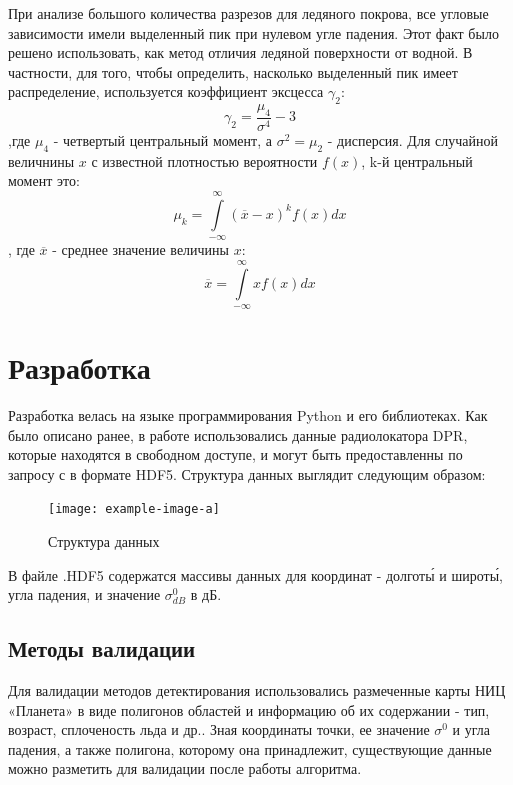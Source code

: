 При анализе большого количества разрезов для ледяного покрова, все  угловые зависимости имели выделенный пик при нулевом
угле падения. Этот факт было решено использовать, как метод отличия ледяной поверхности от водной. В частности, для
того, чтобы определить, насколько выделенный пик имеет распределение, используется коэффициент эксцесса $\gamma_2$:
\begin{equation}
  \gamma_2 = \frac{\mu_4}{\sigma^4} -3
  \label{eq:5}
\end{equation}
,где $\mu_4$ - четвертый центральный момент, а $\sigma^2 = \mu_2$ - дисперсия. Для случайной величнины $x$ с известной плотностью вероятности $f(x)$, k-й
центральный момент это:
\begin{equation}
  \mu_k = \int \limits_{-\infty}^{\infty}(\overline{x}-x)^k f(x) dx
  \label{eq:6}
\end{equation} 
, где $\overline{x}$ - среднее значение величины $x$:
\begin{equation}
  \overline{x} = \int \limits_{-\infty}^{\infty}x f(x) dx
  \label{eq:7}
\end{equation}

 

\section{Разработка}
Разработка велась на языке программирования Python и его библиотеках. Как было описано ранее, в работе использовались
данные радиолокатора DPR, которые находятся в свободном доступе, и могут
быть предоставленны по запросу с \cite{data} в формате HDF5. Структура данных выглядит следующим образом:
\begin{figure}[h!]
  \centering
  \texttt{[image: example-image-a]}
  \caption{Структура данных}
  \label{fig:5}
\end{figure}

В файле .HDF5 содержатся массивы данных для координат - долгот\'{ы} и широт\'{ы}, угла падения, и значение $\sigma^0_{dB}$ в
дБ. 

\subsection{Методы валидации}

Для валидации методов детектирования использовались размеченные карты НИЦ «Планета» в виде полигонов областей и информацию об их содержании
- тип, возраст, сплоченость льда и др.. Зная координаты точки, ее значение $\sigma^0$ и угла падения, а также полигона,
которому она принадлежит, существующие данные можно разметить для валидации после работы алгоритма. 

